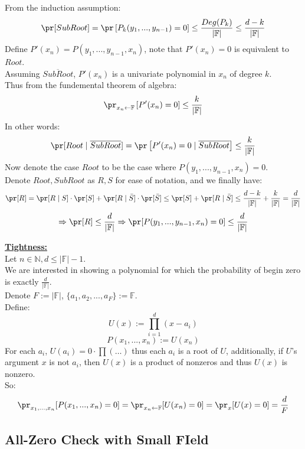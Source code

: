 From the induction assumption:
\[
    \pr[SubRoot]=\pr\left[P_k(y_1,...,y_{n-1})=0\right]
    \leq \frac{Deg(P_k)}{|\mathbb{F}|}
    \leq \frac{d-k}{|\mathbb{F}|}
\]
Define $P'(x_n)=P(y_1,...,y_{n-1},x_n)$, note that $P'(x_n)=0$ is equivalent to $Root$.\\
Assuming $\overline{SubRoot}$, $P'(x_n)$ is a univariate polynomial in $x_n$ of degree $k$.\\
Thus from the fundemental theorem of algebra:
\[
    \pr_{x_n\leftarrow \mathbb{F}}\left[P'(x_n)=0\right]
    \leq \frac{k}{|\mathbb{F}|}
\]
    In other words:
\[
    \pr[Root\mid \overline{SubRoot}]
    =\pr\left[P'(x_n)=0
    \mid \overline{SubRoot}\right]
    \leq \frac{k}{|\mathbb{F}|}    
\]
Now denote the case $Root$ to be the case where $P(y_1,...,y_{n-1}, x_n)=0$.\\
Denote $Root, SubRoot$ as $R,S$ for ease of notation, and we finally have:
\[
    \pr[R]=\pr[R\mid S]\cdot\pr[S]+\pr[R\mid \bar{S}]\cdot\pr[\bar{S}]
    \leq \pr[S]+\pr[R\mid \bar{S}]\leq \frac{d-k}{|\mathbb{F}|}+\frac{k}{|\mathbb{F}|}= \frac{d}{|\mathbb{F}|}
\]\[
    \Rightarrow \pr[R]\leq \frac{d}{|\mathbb{F}|}
    \Rightarrow \pr[P(y_1,...,y_{n-1},x_n)=0]\leq \frac{d}{|\mathbb{F}|}
\]

\underline{\textbf{Tightness:}}\\
Let $n\in\mathbb{N}, d\leq|\mathbb{F}|-1$.\\
We are interested in showing a polynomial for which the probability
of begin zero is exactly $\frac{d}{|\mathbb{F}|}$.\\
Denote $F:=|\mathbb{F}|$, $\{a_1,a_2,...,a_F\}:=\mathbb{F}$.\\
Define:
\[
    U(x):=\prod_{i=1}^d(x-a_i)    
\]
\[
    P(x_1,...,x_n):=U(x_n)    
\]
For each $a_i$, $U(a_i)=0\cdot\prod(\dots)$ thus each $a_i$ is a root of $U$,
additionally, if $U$'s argument $x$ is not $a_i$, then $U(x)$ is a product of nonzeros and thus $U(x)$ is nonzero.\\
So:
\[
    \pr_{x_1,...,x_n}[P(x_1,...,x_n)=0]=\pr_{x_n\leftarrow \mathbb{F}}[U(x_n)=0]
    =\pr_x[U(x)=0]=\frac{d}{F}
\]

\subsection{All-Zero Check with Small FIeld}
